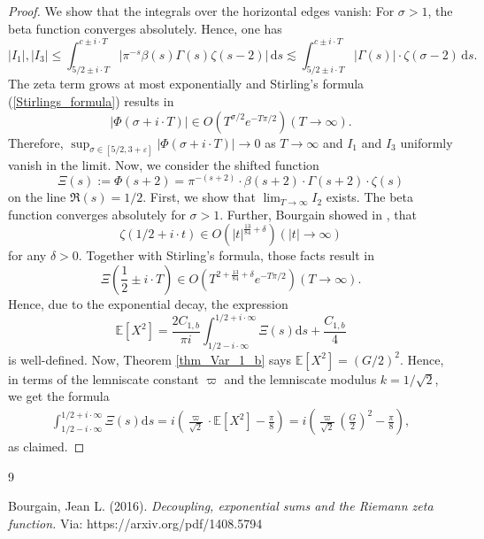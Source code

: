 \documentclass[12pt]{amsart}
\theoremstyle{definition}
\theoremstyle{remark}
\numberwithin{equation}{section}
\newcommand{\1}{\mathbbm{1}}
\begin{document}
{\begin{proof}
We show that the integrals over the horizontal edges vanish: For $\sigma > 1$, the beta function converges absolutely. Hence, one has
$$
\lvert I_1\rvert, \lvert I_3\rvert \le \int_{5/2 \pm i\cdot T}^{c \pm i\cdot T} \lvert \pi^{-s} \beta(s) \Gamma(s) \zeta(s-2) \rvert \, \mathrm{d}s \lesssim \int_{5/2 \pm i\cdot T}^{c \pm i\cdot T} \lvert \Gamma(s) \rvert \cdot \zeta(\sigma-2) \, \mathrm{d}s.
$$
The zeta term grows at most exponentially and Stirling's formula (\ref{Stirlings_formula}) results in 
$$\lvert \Phi(\sigma + i \cdot T)\rvert \in O\left(T^{\sigma/2} e^{-T\pi/2}\right)(T \rightarrow \infty).$$
Therefore, $\sup_{\sigma \in [5/2, 3+\varepsilon]}\lvert \Phi(\sigma + i \cdot T) \rvert \rightarrow 0$ as $T \rightarrow \infty$ and $I_1$ and $I_3$ uniformly vanish in the limit. Now, we consider the shifted function 
$$\Xi(s):= \Phi(s+2) = \pi^{-(s+2)} \cdot \beta(s+2) \cdot \Gamma(s+2) \cdot \zeta(s) $$ 
on the line $\Re(s)=1/2.$ First, we show that $\lim_{T \rightarrow \infty} I_2$ exists. The beta function converges absolutely for $\sigma > 1$. Further, Bourgain showed in \cite{bourgain_2016}, that
$$
\zeta(1/2 + i \cdot t) \in O\left(\lvert t\rvert^{\frac{13}{84}+\delta}\right) (\lvert t\rvert \rightarrow \infty)
$$
for any $\delta > 0$. Together with Stirling's formula, those facts result in
$$\Xi\left(\frac{1}{2} \pm i \cdot T\right) \in O\left(T^{2 + \frac{13}{84} + \delta} e^{-T \pi/2}\right) (T\rightarrow\infty).$$
Hence, due to the exponential decay, the expression 
$$\mathbb{E}\left[X^2 \right] = \frac{2 C_{1,b}}{\pi i} \int_{1/2-i\cdot \infty}^{1/2 + i \cdot \infty} \Xi(s) \mathrm{d}s + \frac{C_{1,b}}{4}$$
is well-defined. Now, Theorem \ref{thm_Var_1_b} says $\mathbb{E}\left[X^2\right] = (G/2)^2$. Hence, in terms of the lemniscate constant $\varpi$ and the lemniscate modulus $k=1/\sqrt{2}$, we get the formula
\begin{align*}
\int_{1/2-i\cdot \infty}^{1/2 + i \cdot \infty} \Xi(s) \mathrm{d}s = i \left( \frac{\varpi}{\sqrt{2}} \cdot \mathbb{E}\left[X^2 \right] - \frac{\pi}{8} \right)= i \left( \frac{\varpi}{\sqrt{2}} \left(\frac{G}{2}\right)^2 - \frac{\pi}{8} \right),
\end{align*}
as claimed.
\end{proof}


\begin{thebibliography}{9}

Bourgain, Jean L. (2016).
\textit{Decoupling, exponential sums and the Riemann zeta function.} 
Via: https://arxiv.org/pdf/1408.5794


\end{thebibliography}}
\end{document}

